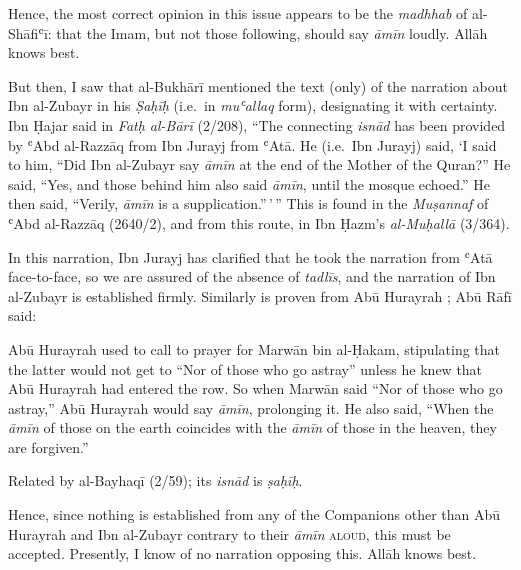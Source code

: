 Hence, the most correct opinion in this issue appears to be the
\emph{madhhab} of al-Shāfiʿī: that the Imam, but not those following,
should say \emph{āmīn} loudly. Allāh knows best.

But then, I saw that al-Bukhārī mentioned the text (only) of the
narration about Ibn al-Zubayr in his \emph{Ṣaḥīḥ} (i.e.~in
\emph{muʿallaq} form), designating it with certainty. Ibn Ḥajar said in
\emph{Fatḥ al-Bārī} (2/208), ``The connecting \emph{isnād} has been
provided by ʿAbd al-Razzāq from Ibn Jurayj from ʿAtā. He (i.e.~Ibn
Jurayj) said, `I said to him, ``Did Ibn al-Zubayr say \emph{āmīn} at the
end of the Mother of the Quran?'' He said, ``Yes, and those behind him
also said \emph{āmīn}, until the mosque echoed.'' He then said,
``Verily, \emph{āmīn} is a supplication.''\,'\,'' This is found in the
\emph{Muṣannaf} of ʿAbd al-Razzāq (2640/2), and from this route, in Ibn
Ḥazm's \emph{al-Muḥallā} (3/364).

In this narration, Ibn Jurayj has clarified that he took the narration
from ʿAtā face-to-face, so we are assured of the absence of
\emph{tadlīs}, and the narration of Ibn al-Zubayr is established firmly.
Similarly is proven from Abū Hurayrah \mabpwhim; Abū Rāfī said:

\begin{mdframed}[style=narration, frametitle={Narration}]
Abū Hurayrah used to call to prayer for Marwān bin al-Ḥakam, stipulating that the latter would not get to “Nor of those who go astray” unless he knew that Abū Hurayrah had entered the row. So when Marwān said “Nor of those who go astray,” Abū Hurayrah would say \textit{āmīn}, prolonging it. He also said, “When the \textit{āmīn} of those on the earth coincides with the \textit{āmīn} of those in the heaven, they are forgiven.”
\end{mdframed}

Related by al-Bayhaqī (2/59); its \emph{isnād} is \emph{ṣaḥīḥ}.

Hence, since nothing is established from any of the Companions other
than Abū Hurayrah and Ibn al-Zubayr \mabpwthem contrary to their
\emph{āmīn} \textsc{aloud}, this must be accepted. Presently, I know of
no narration opposing this. Allāh knows best.
